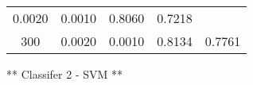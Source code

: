 \documentclass[11pt]{article}
\begin{document}
\begin{longtable}[]{@{}ccccc@{}}
\begin{minipage}[t]{0.21\columnwidth}
0.0020\strut
\end{minipage} & \begin{minipage}[t]{0.20\columnwidth}\centering\strut
0.0010\strut
\end{minipage} & \begin{minipage}[t]{0.15\columnwidth}\centering\strut
0.8060\strut
\end{minipage} & \begin{minipage}[t]{0.14\columnwidth}\centering\strut
0.7218\strut
\end{minipage}\tabularnewline
\begin{minipage}[t]{0.16\columnwidth}\centering\strut
300\strut
\end{minipage} & \begin{minipage}[t]{0.21\columnwidth}\centering\strut
0.0020\strut
\end{minipage} & \begin{minipage}[t]{0.20\columnwidth}\centering\strut
0.0010\strut
\end{minipage} & \begin{minipage}[t]{0.15\columnwidth}\centering\strut
0.8134\strut
\end{minipage} & \begin{minipage}[t]{0.14\columnwidth}\centering\strut
0.7761\strut
\end{minipage}\tabularnewline
\bottomrule
\end{longtable}

** Classifer 2 - SVM **
\end{document}
